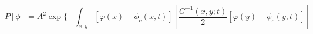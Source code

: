\begin{equation}
P[\phi] = A^2 \exp \{ -\int_{x,y}[\varphi
(x)-  \phi_c(x,t)]
[\frac {G^{-1}(x,y;t)}{2}
[\varphi(y)-
 \phi_c (y,t)]]
\end{equation}

